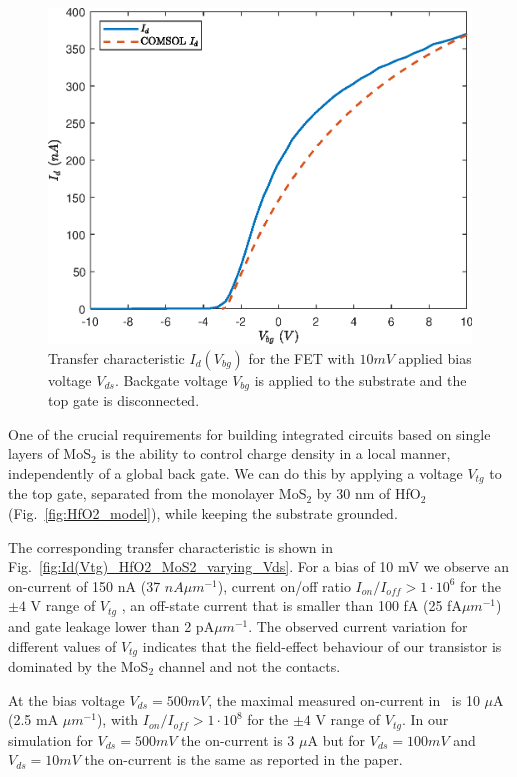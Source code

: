 \documentclass[12pt,a4paper,titlepage]{article}
\begin{document}
\begin{figure}[H]
	\centering
	\includegraphics[width=.75\textwidth]{Grafici/Id(Vbg)_HfO2_MoS2.eps} 
	\caption{Transfer characteristic $I_d(V_{bg})$ for the FET with $10 mV$ applied bias voltage $V_{ds}$. Backgate voltage $V_{bg}$ is applied to the substrate and the top gate is disconnected.}
	\label{fig:Id(Vbg)_HfO2_MoS2}
\end{figure}

One of the crucial requirements for building integrated circuits based on single layers of MoS$_2$ is the ability to control charge density in a local manner, independently of a global back gate. We can do this by applying a voltage $V_{tg}$ to the top gate, separated from the monolayer MoS$_2$ by 30 nm of HfO$_2$ (Fig.~\ref{fig:HfO2_model}), while keeping the substrate grounded.

The corresponding transfer characteristic is shown in Fig.~\ref{fig:Id(Vtg)_HfO2_MoS2_varying_Vds}. For a bias of 10 mV we observe an on-current of 150 nA (37 $nA\mu m^{-1}$), current on/off ratio $I_{on}/I_{off} > 1 \cdot 10^6$ for the $\pm 4$ V range of $V_{tg}$ , an off-state current that is smaller than 100 fA (25 fA$\mu m^{-1}$) and gate leakage lower than 2 pA$\mu m^{-1}$. The observed current variation for different values of $V_{tg}$ indicates that the field-effect behaviour of our transistor is dominated by the MoS$_2$ channel and not the contacts.

At the bias voltage $V_{ds} = 500 mV$, the maximal measured on-current in~\cite{Radisavljevic:Si_MoS2} is 10 $\mu$A (2.5 mA $\mu m^{-1}$), with $I_{on}/I_{off} > 1 \cdot 10^8$ for the $\pm 4$ V range of $V_{tg}$. In our simulation for $V_{ds} = 500 mV$ the on-current is 3 $\mu$A but for  $V_{ds} = 100 mV$ and  $V_{ds} = 10 mV$ the on-current is the same as reported in the paper. 
\end{document}
